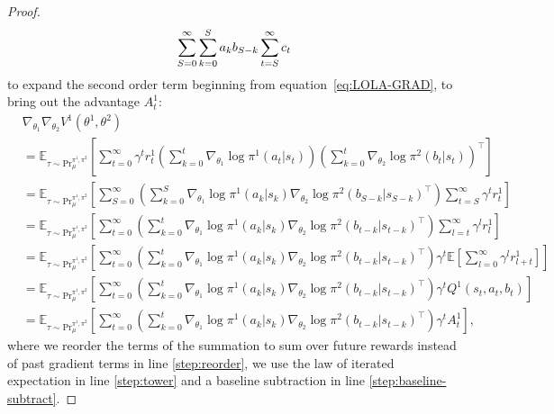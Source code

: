 \documentclass{article} \usepackage{iclr2025_conference,times}
\def\eqref#1{equation~\ref{#1}}
\begin{document}
\begin{proof}
\begin{equation}
    \sum_{S=0}^\infty  \sum_{k=0}^S a_k b_{S-k} \sum_{t=S}^\infty c_t
    \notag
\end{equation}
to expand the second order term beginning from \eqref{eq:LOLA-GRAD}, to bring out the advantage $A_t^1$:
\begin{align}
    &\nabla_{\theta_1}\nabla_{\theta_2}V^1(\theta^1, \theta^2) \\
    &=\mathbb{E}_{\tau \sim \text{Pr}_{\mu}^{\pi^1, \pi^2}}\left[\sum_{t=0}^\infty \gamma^t r^1_t\left(\sum_{k=0}^t \nabla_{\theta_1}\log \pi^1(a_t|s_t) \right)\left(\sum_{k=0}^t \nabla_{\theta_2}\log \pi^2(b_t|s_t)\right)^\top\right]\\
    &= \mathbb{E}_{\tau \sim \text{Pr}_{\mu}^{\pi^1, \pi^2}}\left[\sum_{S=0}^\infty \left(\sum_{k=0}^S \nabla_{\theta_1}\log \pi^1(a_k|s_k) \nabla_{\theta_2}\log \pi^2(b_{S-k}|s_{S-k})^\top\right) \sum_{t=S}^\infty \gamma^t r^1_t\right] \label{step:reorder}\\
    &= \mathbb{E}_{\tau \sim \text{Pr}_{\mu}^{\pi^1, \pi^2}}\left[\sum_{t=0}^\infty \left(\sum_{k=0}^t \nabla_{\theta_1}\log \pi^1(a_k|s_k) \nabla_{\theta_2}\log \pi^2(b_{t-k}|s_{t-k})^\top \right)\sum_{l=t}^\infty \gamma^l r^1_l\right]\\
    &= \mathbb{E}_{\tau \sim \text{Pr}_{\mu}^{\pi^1, \pi^2}}\left[\sum_{t=0}^\infty\left(\sum_{k=0}^t \nabla_{\theta_1}\log \pi^1(a_k|s_k) \nabla_{\theta_2}\log \pi^2(b_{t-k}|s_{t-k})^\top \right)\gamma^t \mathbb{E}\left[\sum_{l=0}^\infty \gamma^l r^1_{l+t}\right]\right]\label{step:tower}\\
    &= \mathbb{E}_{\tau \sim \text{Pr}_{\mu}^{\pi^1, \pi^2}}\left[\sum_{t=0}^\infty \left(\sum_{k=0}^t \nabla_{\theta_1}\log \pi^1(a_k|s_k) \nabla_{\theta_2}\log \pi^2(b_{t-k}|s_{t-k})^\top \right)\gamma^t Q^1(s_t,a_t, b_t)\right]\\
    &= \mathbb{E}_{\tau \sim \text{Pr}_{\mu}^{\pi^1, \pi^2}}\left[\sum_{t=0}^\infty\left(\sum_{k=0}^t \nabla_{\theta_1}\log \pi^1(a_k|s_k) \nabla_{\theta_2}\log \pi^2(b_{t-k}|s_{t-k})^\top \right) \gamma^t A^1_t\label{step:baseline-subtract}\right],
\end{align}
where we reorder the terms of the summation to sum over future rewards instead of past gradient terms in line \ref{step:reorder}, we use the law of iterated expectation in line \ref{step:tower} and a baseline subtraction in line \ref{step:baseline-subtract}.


\end{proof}
\end{document}
